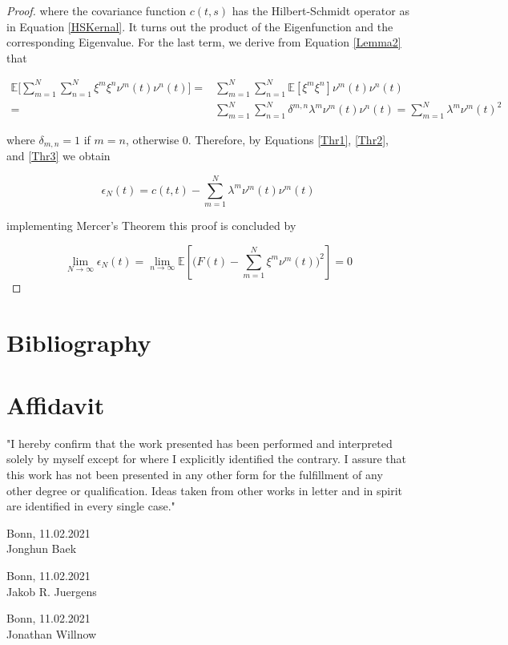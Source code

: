 \documentclass[11pt,twoside,a4paper]{article}
\begin{document}
\begin{proof}
		where the covariance function $c(t,s)$ has the Hilbert-Schmidt operator as in Equation \ref{HSKernal}. It turns out the product of the Eigenfunction and the corresponding Eigenvalue. For the last term, we derive from Equation \ref{Lemma2} that
		
		\begin{equation}\label{Thr3}
			\begin{split}
				\mathbb{E}\bigg[\sum_{m=1}^{N} \sum_{n=1}^{N} \xi^m \xi^n \nu^m(t) \nu^n(t)\bigg] = & \sum_{m=1}^{N} \sum_{n=1}^{N} \mathbb{E}[\xi^m \xi^n] \nu^m(t) \nu^n(t)\\
				= & \sum_{m=1}^{N} \sum_{n=1}^{N} \delta^{m,n} \lambda^m \nu^m(t) \nu^n(t) = 		\sum_{m=1}^{N} \lambda^m \nu^m(t)^{2}
			\end{split}	
		\end{equation}
	
		where $\delta_{m,n} = 1$ if $m=n$, otherwise 0. Therefore, by Equations \ref{Thr1}, \ref{Thr2}, and \ref{Thr3} we obtain
		
		\begin{equation}
			\epsilon_{N}(t) = c(t,t) - \sum_{m=1}^{N} \lambda^m \nu^m(t) \nu^m(t)
		\end{equation}
		
		implementing Mercer's Theorem this proof is concluded by
		
		\begin{equation}
			\lim\limits_{N \rightarrow \infty} \epsilon_{N}(t) = \lim\limits_{n \rightarrow \infty} \mathbb{E} \left[\bigg( F(t) - \sum_{m=1}^{N} \xi^m \nu^m(t)\bigg)^2 \right] = 0
		\end{equation}
	
	\end{proof}

	\newpage
	
	\section{Bibliography}
	\printbibliography[heading=none]	
	
	\newpage
	\section*{Affidavit}
	
	\vspace{2cm}
	"I hereby confirm that the work presented has been performed and
	interpreted solely by myself except for where I explicitly identified the
	contrary. I assure that this work has not been presented in any other
	form for the fulfillment of any other degree or qualification. Ideas
	taken from other works in letter and in spirit are identified in every
	single case."
	
	\vspace{2cm}
	Bonn, 11.02.2021 \hrulefill \\
	\hspace*{0mm}Jonghun Baek
	
	\vspace{2cm}
	Bonn, 11.02.2021 \hrulefill \\
	\hspace*{0mm}Jakob R. Juergens
	
	\vspace{2cm}
	Bonn, 11.02.2021 \hrulefill \\
	\hspace*{0mm}Jonathan Willnow
	
	
\end{document}
